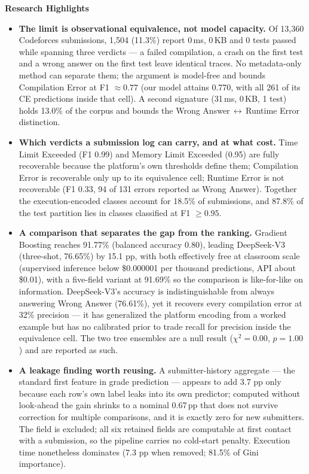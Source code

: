 \documentclass[11pt]{article}
\begin{document}
\vspace{-2ex}
\noindent\textbf{Research Highlights}\\[1ex]
\begin{itemize}\setlength\itemsep{0.6em}
\item \textbf{The limit is observational equivalence, not model capacity.} Of 13,360 Codeforces submissions, 1,504 (11.3\%) report 0\,ms, 0\,KB and 0 tests passed while spanning three verdicts --- a failed compilation, a crash on the first test and a wrong answer on the first test leave identical traces. No metadata-only method can separate them; the argument is model-free and bounds Compilation Error at F1 $\approx 0.77$ (our model attains 0.770, with all 261 of its CE predictions inside that cell). A second signature (31\,ms, 0\,KB, 1 test) holds 13.0\% of the corpus and bounds the Wrong Answer\,$\leftrightarrow$\,Runtime Error distinction.

\item \textbf{Which verdicts a submission log can carry, and at what cost.} Time Limit Exceeded (F1 0.99) and Memory Limit Exceeded (0.95) are fully recoverable because the platform's own thresholds define them; Compilation Error is recoverable only up to its equivalence cell; Runtime Error is not recoverable (F1 0.33, 94 of 131 errors reported as Wrong Answer). Together the execution-encoded classes account for 18.5\% of submissions, and 87.8\% of the test partition lies in classes classified at F1 $\ge 0.95$.

\item \textbf{A comparison that separates the gap from the ranking.} Gradient Boosting reaches 91.77\% (balanced accuracy 0.80), leading DeepSeek-V3 (three-shot, 76.65\%) by 15.1 pp, with both effectively free at classroom scale (supervised inference below \$0.000001 per thousand predictions, API about \$0.01), with a five-field variant at 91.69\% so the comparison is like-for-like on information. DeepSeek-V3's accuracy is indistinguishable from always answering Wrong Answer (76.61\%), yet it recovers every compilation error at 32\% precision --- it has generalized the platform encoding from a worked example but has no calibrated prior to trade recall for precision inside the equivalence cell. The two tree ensembles are a null result ($\chi^2=0.00$, $p=1.00$) and are reported as such.

\item \textbf{A leakage finding worth reusing.} A submitter-history aggregate --- the standard first feature in grade prediction --- appears to add 3.7 pp only because each row's own label leaks into its own predictor; computed without look-ahead the gain shrinks to a nominal 0.67\,pp that does not survive correction for multiple comparisons, and it is exactly zero for new submitters. The field is excluded; all six retained fields are computable at first contact with a submission, so the pipeline carries no cold-start penalty. Execution time nonetheless dominates (7.3 pp when removed; 81.5\% of Gini importance).


\end{itemize}
\end{document}
